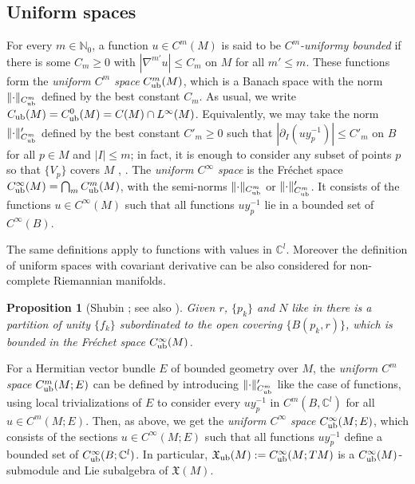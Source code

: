 \documentclass{memo-l}
\theoremstyle{plain}
\newtheorem{prop}[thm]{Proposition}
\theoremstyle{definition}
\theoremstyle{remark}
\newcommand{\C}{\mathbb{C}}
\newcommand{\N}{\mathbb{N}}
\newcommand{\fX}{\mathfrak{X}}
\newcommand{\Cinftyub}{C^\infty_{\text{\rm ub}}}
\newcommand{\fXub}{\fX_{\text{\rm ub}}}
\numberwithin{section}{chapter}
\numberwithin{equation}{section}%
\begin{document}
\subsection{Uniform spaces}\label{ss: uniform sps}

For every $m\in\N_0$, a function $u\in C^m(M)$ is said to be \emph{$C^m$-uniformy bounded} if there is some $C_m\ge0$ with $|\nabla^{m'}u|\le C_m$ on $M$ for all $m'\le m$. These functions form the \emph{uniform $C^m$ space} $C_{\text{\rm ub}}^m(M)$, which is a Banach space with the norm $\|{\cdot}\|_{C^m_{\text{\rm ub}}}$ defined by the best constant $C_m$. As usual, we write $C_{\text{\rm ub}}(M)=C_{\text{\rm ub}}^0(M)=C(M)\cap L^\infty(M)$. Equivalently, we may take the norm $\|{\cdot}\|'_{C^m_{\text{\rm ub}}}$ defined by the best constant $C'_m\ge0$ such that $|\partial_I(uy_p^{-1})|\le C'_m$ on $B$ for all $p\in M$ and $|I|\le m$; in fact, it is enough to consider any subset of points $p$ so that $\{V_p\}$ covers $M$ \cite[Theorem~A.22]{Schick1996}, \cite[Proposition~3.3]{Schick2001}. The \emph{uniform $C^\infty$ space} is the Fr\'echet space $\Cinftyub(M)=\bigcap_mC_{\text{\rm ub}}^m(M)$, with the semi-norms $\|{\cdot}\|_{C^m_{\text{\rm ub}}}$ or $\|{\cdot}\|'_{C^m_{\text{\rm ub}}}$. It consists of the functions $u\in C^\infty(M)$ such that all functions $uy_p^{-1}$ lie in a bounded set of $C^\infty(B)$. 

The same definitions apply to functions with values in $\C^l$. Moreover the definition of uniform spaces with covariant derivative can be also considered for non-complete Riemannian manifolds.

\begin{prop}[{Shubin \cite[Appendix~A1.1, Lemma~1.3]{Shubin1992}; see also \cite[Proposition~3.2]{Schick2001}}]\label{p: f_k}
Given $r$, $\{p_k\}$ and $N$ like in  there is a partition of unity $\{f_k\}$ subordinated to the open covering $\{B(p_k,r)\}$, which is bounded in the Fr\'echet space $\Cinftyub(M)$.
\end{prop}

For a Hermitian vector bundle $E$ of bounded geometry over $M$, the \emph{uniform $C^m$ space} $C_{\text{\rm ub}}^m(M;E)$ can be defined by introducing $\|{\cdot}\|'_{C^m_{\text{\rm ub}}}$ like the case of functions, using local trivializations of $E$ to consider every $uy_p^{-1}$ in $C^m(B,\C^l)$ for all $u\in C^m(M;E)$. Then, as above, we get the \emph{uniform $C^\infty$ space} $\Cinftyub(M;E)$, \index{$\Cinftyub(M;E)$} which consists of the sections $u\in C^\infty(M;E)$ such that all functions $uy_p^{-1}$ define a bounded set of $\Cinftyub(B;\C^l)$. In particular, $\fXub(M):=\Cinftyub(M;TM)$ is a $\Cinftyub(M)$-submodule and Lie subalgebra of $\fX(M)$.
\end{document}
